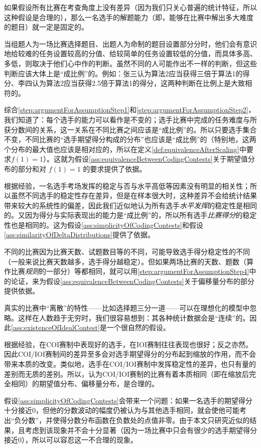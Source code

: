         \begin{asparaenum}
            \item \label{step:argumentForAssumptionStep1} 如果假设所有比赛在考查角度上没有差异（因为我们只关心普遍的统计特征，所以这种假设是合理的），那么一名选手的解题能力（即，能够在比赛中解出多大难度的题目）就一定是固定的。
            \item \label{step:argumentForAssumptionStep2} 当组题人为一场比赛选择题目、出题人为命制的题目设置部分分时，他们会有意识地给较难的任务设置较高的分值、给较简单的任务设置较低的分值，而具体多高、多低，则取决于他们心中作的判断。虽然不同的人可能作出不一样的判断，但这些判断应该大体上是“成比例”的。例如：张三认为算法2应当获得三倍于算法1的得分、李四认为算法2应当获得2.5倍于算法1的得分，这两种判断在比例上是大致相符的。
            \item 综合\ref{step:argumentForAssumptionStep1}和\ref{step:argumentForAssumptionStep2}，我们知道了：每个选手的能力可以看作是不变的；选手比赛中完成的任务难度与所获分数间的关系，这一关系在不同比赛之间应该是“成比例”的。所以只要选手集合不变，不同比赛的“选手期望得分构成的分布”也应该是“成比例”的（特别地，这两个分布的最大值也应该是相对应的，所以在定义\ref{def:equivalenceAfterScaling}中要求$f(1)=1$）。这就为假设\ref{ass:equivalenceBetweenCodingContests}关于期望值分布的部分和对 $f(1)=1$ 的要求提供了依据。
            \item \label{step:argumentForAssumptionStep4} 根据经验，一名选手考场发挥的稳定与否与水平高低等因素没有明显的相关性；所以虽然不同选手的稳定性存在差异，但是在样本很大时，这种差异不会给统计结果带来较大的系统性的偏差，因此我们近似地认为所有选手\emph{水平发挥}的稳定性是相同的。又因为得分与实际表现出的能力是“成比例”的，所以所有选手\emph{比赛得分}的稳定性也是相同的。这为假设\ref{ass:simplicityOfCodingContests}和假设\ref{ass:similarityOfDeltaDistributions}提供了依据。
            \item 不同的比赛因为比赛天数、试题数目等的不同，可能导致选手得分稳定性的不同（一般来说比赛天数越多，选手得分越稳定）。但如果两场比赛的天数、题数（算作比赛\emph{规则}的一部分）等都相同，就可以用\ref{step:argumentForAssumptionStep4}中的论证，来为假设\ref{ass:equivalenceBetweenCodingContests}关于偏移量分布的部分提供依据。
            \item 真实的比赛中“离散”的特性——比如选择题三分一道——可以在理想化的模型中忽略。这样在人数趋于无穷时，我们很容易想到：其各种统计数据会是“连续”的。因此\ref{ass:existenceOfIdealContest}是一个很自然的假设。
            \item 根据经验，在COI赛制中表现好的选手，在IOI赛制往往表现也很好；反之亦然。因此COI/IOI赛制间的差异至多会对选手期望得分的分布起到缩放的作用，而不会带来本质的改变。类似地，选手在COI/IOI赛制中发挥稳定性的差异，也只有量的差别而无质的差别。所以，认为COI/IOI赛制的比赛有着本质相同（即在缩放后完全相同）的期望值分布、偏移量分布，是合理的。
            \item 假设\ref{ass:simplicityOfCodingContests}会带来一个问题：如果一名选手的期望得分十分接近0，但他的分数波动的幅度仍被认为与其他选手相同，就会使他可能考出“负分数”，并使得分数分布函数在负数处的点值非零。由于本文只研究近似的结果，且考虑到该现象并不会十分显著（因为一场比赛中只会有很少的选手期望得分接近0），所以可以容忍这一不合理的现象。
        \end{asparaenum}

